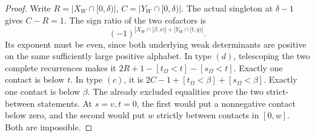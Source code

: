 \documentclass[11pt,a4paper]{amsart}
\numberwithin{equation}{section}
\theoremstyle{plain}
\theoremstyle{definition}
\begin{document}
\begin{proof}
Write \(R=|X_W\cap[0,\delta)|\),
\(C=|Y_W\cap[0,\delta)|\).  The actual singleton at \(\delta-1\)
gives \(C-R=1\).
The sign ratio of the two cofactors is
\[
 (-1)^{|X_W\cap[\beta,s)|+|Y_W\cap[t,y)|}.
\]
Its exponent must be even, since both underlying weak determinants
are positive on the same sufficiently large positive alphabet.
In type \((d)\), telescoping the two complete recurrences makes it
\(2R+1-[t_\Omega<t]-[s_\Omega<t]\).
Exactly one contact is below \(t\).
In type \((c)\), it is
\(2C-1+[t_\Omega<\beta]+[s_\Omega<\beta]\).
Exactly one contact is below \(\beta\).
The already excluded equalities prove the two strict-between statements.
At \(s=v,t=0\), the first would put a nonnegative contact below zero,
and the second would put \(w\) strictly between contacts in \([0,w]\).
Both are impossible.
\end{proof}
\end{document}
